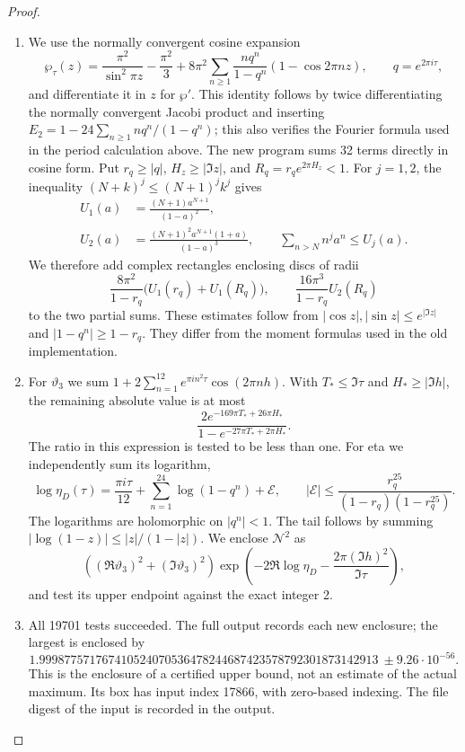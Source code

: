 \begin{proof}
\begin{enumerate}[label=\arabic*.,leftmargin=*]
\item We use the normally convergent cosine expansion
\[
 \wp_\tau(z)=\frac{\pi^2}{\sin^2\pi z}-\frac{\pi^2}{3}
 +8\pi^2\sum_{n\geq1}\frac{nq^n}{1-q^n}
                      (1-\cos 2\pi nz),\qquad q=e^{2\pi i\tau},
\]
and differentiate it in $z$ for $\wp'$. This identity follows by twice
differentiating the normally convergent Jacobi product and inserting
$E_2=1-24\sum_{n\geq1}nq^n/(1-q^n)$; this also verifies the
Fourier formula used in the period calculation above. The new program sums
32 terms directly in cosine form. Put $r_q\geq|q|$,
$H_z\geq|\Im z|$, and $R_q=r_q e^{2\pi H_z}<1$.
For $j=1,2$, the inequality $(N+k)^j\leq(N+1)^jk^j$ gives
\[
 \begin{aligned}
 U_1(a)&=\frac{(N+1)a^{N+1}}{(1-a)^2},\\
 U_2(a)&=\frac{(N+1)^2a^{N+1}(1+a)}{(1-a)^3},
 \qquad
 \sum_{n>N}n^j a^n\leq U_j(a).
 \end{aligned}
\]
We therefore add complex rectangles enclosing discs of radii
\[
 \frac{8\pi^2}{1-r_q}\bigl(U_1(r_q)+U_1(R_q)\bigr),
 \qquad \frac{16\pi^3}{1-r_q}U_2(R_q)
\]
to the two partial sums. These estimates follow from
$|\cos z|,|\sin z|\leq e^{|\Im z|}$ and
$|1-q^n|\geq1-r_q$. They differ from the moment formulas used in
the old implementation.

\item For $\vartheta_3$ we sum
$1+2\sum_{n=1}^{12}e^{\pi i n^2\tau}\cos(2\pi nh)$.
With $T_*\leq\Im\tau$ and $H_*\geq|\Im h|$, the remaining
absolute value is at most
\[
 \frac{2e^{-169\pi T_*+26\pi H_*}}
 {1-e^{-27\pi T_*+2\pi H_*}}.
\]
The ratio in this expression is tested to be less than one. For eta
we independently sum its logarithm,
\[
 \log\eta_D(\tau)=\frac{\pi i\tau}{12}
          +\sum_{n=1}^{24}\log(1-q^n)+\mathcal E,
 \qquad
 |\mathcal E|\leq
 \frac{r_q^{25}}{(1-r_q)(1-r_q^{25})}.
\]
The logarithms are holomorphic on $|q^n|<1$. The tail follows by
summing $|\log(1-z)|\leq|z|/(1-|z|)$.
We enclose $\mathcal N^2$ as
\[
 ((\Re\vartheta_3)^2+(\Im\vartheta_3)^2)
 \exp\left(-2\Re\log\eta_D-
                   \frac{2\pi(\Im h)^2}{\Im\tau}\right),
\]
and test its upper endpoint against the exact integer 2.

\item All 19701 tests succeeded. The full output records each new enclosure;
the largest is enclosed by
\[
 1.999877571767410524070536478244687423578792301873142913
       \ \pm 9.26\cdot10^{-56}.
\]
This is the enclosure of a certified upper bound, not an estimate of
the actual maximum. Its box has input index 17866, with zero-based
indexing. The file digest of the input is recorded in the output.


\end{enumerate}
\end{proof}

